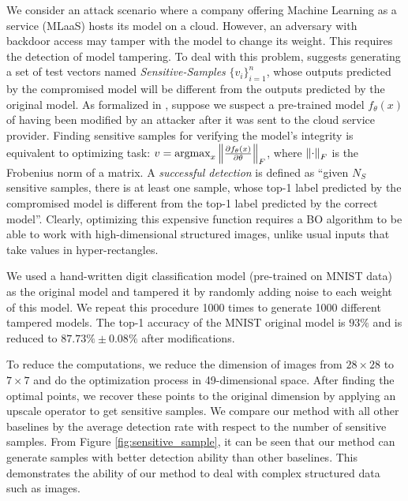 We consider an attack scenario where a company offering Machine Learning as a service (MLaaS) hosts its model on a cloud. However, an adversary with backdoor access may tamper with the model to change its weight. This requires the detection of model tampering. To deal with this problem, \citet{he2018verideep} suggests generating a set of test vectors named \emph{Sensitive-Samples} $\{v_i\}_{i=1}^n$, whose outputs predicted by the compromised model will be different from the outputs predicted by the original model. As formalized in \citet{he2018verideep}, suppose we suspect a pre-trained model $f_\theta(x)$ of having been modified by an attacker after it was sent to the cloud service provider. Finding sensitive samples for verifying the model's integrity is equivalent to optimizing task: $v = \operatorname*{argmax}_x \norm{\frac{\partial f_\theta(x)}{\partial \theta}}_F$, where $\norm{\cdot}_F$ is the Frobenius norm of a matrix. A \emph{successful detection} is defined as ``given $N_S$ sensitive samples, there is at least one sample, whose top-1 label predicted by the compromised model is different from the top-1 label predicted by the correct model''. Clearly, optimizing this expensive function requires a BO algorithm to be able to work with high-dimensional structured images, unlike usual inputs that take values in hyper-rectangles.

We used a hand-written digit classification model (pre-trained on MNIST data) as the original model and tampered it by randomly adding noise to each weight of this model. We repeat this procedure 1000 times to generate 1000 different tampered models. The top-1 accuracy of the MNIST original model is $93\%$ and is reduced to $87.73\% \pm 0.08\%$ after modifications.   

To reduce the computations, we reduce the dimension of images from $28 \times 28$ to $7 \times 7$ and do the optimization process in 49-dimensional space. After finding the optimal points, we recover these points to the original dimension by applying an upscale operator to get sensitive samples. We compare our method with all other baselines by the average detection rate with respect to the number of sensitive samples. From Figure \ref{fig:sensitive_sample}, it can be seen that our method can generate  samples with better detection ability than other baselines. This demonstrates the ability of  our method to deal with complex structured data such as images. 

